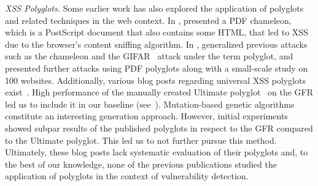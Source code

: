 \textit{XSS Polyglots.}
Some earlier work has also explored the application of polyglots and related techniques in the web context.
In \citeyear{barth2009secure}, \citet{barth2009secure} presented a PDF chameleon, which is a PostScript document that also contains some HTML, that led to XSS due to the browser's content sniffing algorithm.
In \citeyear{magazinius2013polyglots}, \citet{magazinius2013polyglots} generalized previous attacks such as the chameleon and the GIFAR~\cite{brandis2009exploring} attack under the term polyglot, and presented further attacks using PDF polyglots along with a small-scale study on 100 websites.
Additionally, various blog posts regarding universal XSS polyglots exist~\cite{ultimate-polyglot, szurek-polyglot, ostorlab-polyglot}.
High performance of the manually created Ultimate polyglot~\cite{ultimate-polyglot} on the GFR led us to include it in our baseline (see~).
Mutation-based genetic algorithms~\cite{ostorlab-polyglot} constitute an interesting generation approach.
However, initial experiments showed subpar results of the published polyglots in respect to the GFR compared to the Ultimate polyglot.
This led us to not further pursue this method.
Ultimately, these blog posts lack systematic evaluation of their polyglots and, to the best of our knowledge, none of the previous publications studied the application of polyglots in the context of \blindxss{} vulnerability detection. %